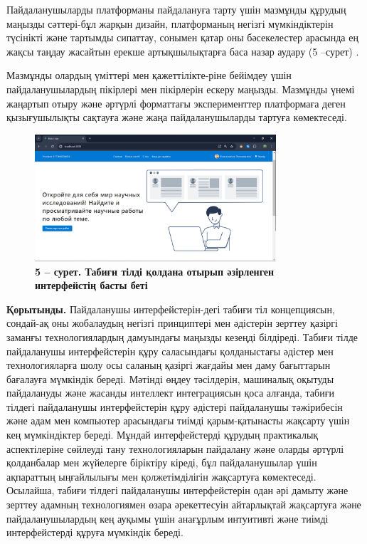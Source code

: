 \begin{multicols}{2}
Пайдаланушыларды платформаны пайдалануға тарту үшін мазмұнды құрудың
маңызды сәттері-бұл жарқын дизайн, платформаның негізгі мүмкіндіктерін
түсінікті және тартымды сипаттау, сонымен қатар оны бәсекелестер
арасында ең жақсы таңдау жасайтын ерекше артықшылықтарға баса назар
аудару (5 --сурет) .

Мазмұнды олардың үміттері мен қажеттілікте-ріне бейімдеу үшін
пайдаланушылардың пікірлері мен пікірлерін ескеру маңызды. Мазмұнды
үнемі жаңартып отыру және әртүрлі форматтағы эксперименттер платформаға
деген қызығушылықты сақтауға және жаңа пайдаланушыларды тартуға
көмектеседі.
\end{multicols}



\begin{figure}[H]
	\centering
	\includegraphics[width=0.8\textwidth]{assets/146}
	\caption*{\bfseries 5 -- сурет. Табиғи тілді қолдана отырып әзірленген интерфейстің
  басты беті}
\end{figure}

\begin{multicols}{2}

{\bfseries Қорытынды.} Пайдаланушы интерфейстерін-дегі табиғи тіл
концепциясын, сондай-ақ оны жобалаудың негізгі принциптері мен әдістерін
зерттеу қазіргі заманғы технологиялардың дамуындағы маңызды кезеңді
білдіреді. Табиғи тілде пайдаланушы интерфейстерін құру саласындағы
қолданыстағы әдістер мен технологияларға шолу осы саланың қазіргі
жағдайы мен даму бағыттарын бағалауға мүмкіндік береді. Мәтінді өңдеу
тәсілдерін, машиналық оқытуды пайдалануды және жасанды интеллект
интеграциясын қоса алғанда, табиғи тілдегі пайдаланушы интерфейстерін
құру әдістері пайдаланушы тәжірибесін және адам мен компьютер арасындағы
тиімді қарым-қатынасты жақсарту үшін кең мүмкіндіктер береді. Мұндай
интерфейстерді құрудың практикалық аспектілеріне сөйлеуді тану
технологияларын пайдалану және оларды әртүрлі қолданбалар мен жүйелерге
біріктіру кіреді, бұл пайдаланушылар үшін ақпараттың ыңғайлылығы мен
қолжетімділігін жақсартуға көмектеседі. Осылайша, табиғи тілдегі
пайдаланушы интерфейстерін одан әрі дамыту және зерттеу адамның
технологиямен өзара әрекеттесуін айтарлықтай жақсартуға және
пайдаланушылардың кең ауқымы үшін анағұрлым интуитивті және тиімді
интерфейстерді құруға мүмкіндік береді.
\end{multicols}


